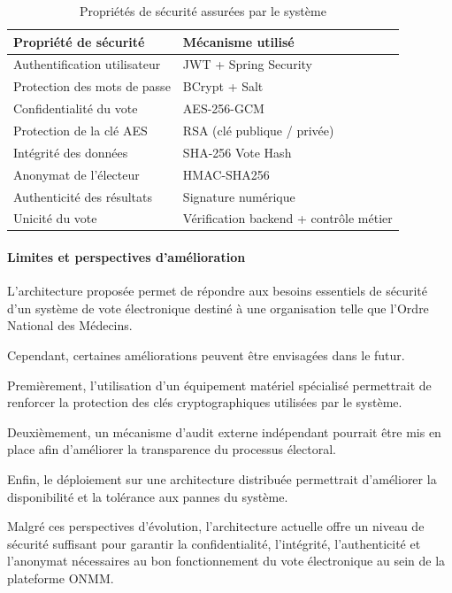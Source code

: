 ﻿\documentclass[12pt,a4paper]{report}
\begin{document}
\begin{table}[H]
\centering
\begin{tabular}{|p{7cm}|p{6cm}|}
\hline
\textbf{Propriété de sécurité} & \textbf{Mécanisme utilisé} \\
\hline
Authentification utilisateur & JWT + Spring Security \\
\hline
Protection des mots de passe & BCrypt + Salt \\
\hline
Confidentialité du vote & AES-256-GCM \\
\hline
Protection de la clé AES & RSA (clé publique / privée) \\
\hline
Intégrité des données & SHA-256 Vote Hash \\
\hline
Anonymat de l’électeur & HMAC-SHA256 \\
\hline
Authenticité des résultats & Signature numérique \\
\hline
Unicité du vote & Vérification backend + contrôle métier \\
\hline
\end{tabular}
\caption{Propriétés de sécurité assurées par le système}
\end{table}

\paragraph{Limites et perspectives d’amélioration}\mbox{}

L’architecture proposée permet de répondre aux besoins essentiels de sécurité
d’un système de vote électronique destiné à une organisation telle que l’Ordre
National des Médecins.

Cependant, certaines améliorations peuvent être envisagées dans le futur.

Premièrement, l’utilisation d’un équipement matériel spécialisé permettrait de
renforcer la protection des clés cryptographiques utilisées par le système.

Deuxièmement, un mécanisme d’audit externe indépendant pourrait être mis en
place afin d’améliorer la transparence du processus électoral.

Enfin, le déploiement sur une architecture distribuée permettrait d’améliorer
la disponibilité et la tolérance aux pannes du système.

Malgré ces perspectives d’évolution, l’architecture actuelle offre un niveau de
sécurité suffisant pour garantir la confidentialité, l’intégrité,
l’authenticité et l’anonymat nécessaires au bon fonctionnement du vote
électronique au sein de la plateforme ONMM.
\end{document}

